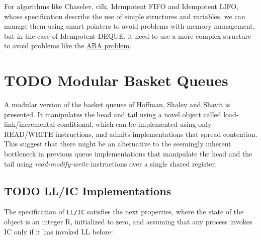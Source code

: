 \documentclass{latex/classes/thesis}
\begin{document}
For algorithms like Chaselev\cite{circular.work.stealing},
cilk\cite{implementation_cilk5}, Idempotent FIFO and Idempotent
LIFO\cite{maged.vechev.2009}, whose specification describe the use of simple
structures and variables, we can manage them using smart pointers to avoid
problems with memory management, but in the case of Idempotent
DEQUE\cite{maged.vechev.2009}, it need to use a more complex structure to
avoid problems like the \href{https://www.stroustrup.com/isorc2010.pdf}{ABA problem}.



\chapter{{\bfseries\sffamily TODO} Modular Basket Queues}
\label{sec:org02893af}

A modular version of the basket queues of Hoffman, Shalev and Shavit is
presented. It manipulates the head and tail using a novel object called
load-link/incremental-conditional, which can be implemented using only
READ/WRITE instructions, and admits implementations that spread
contention. This suggest that there might be an alternative to the seemingly
inherent bottleneck in previous queue implementations that manipulate the
head and the tail using \emph{read-modify-write} instructions over a single shared
register.

\section{{\bfseries\sffamily TODO} LL/IC Implementations}
\label{sec:org65c6636}

The specification of \texttt{LL/IC} satisfies the next properties, where the state of
the object is an integer R, initialized to zero, and assuming that any
process invokes IC only if it has invoked LL before:
\end{document}
